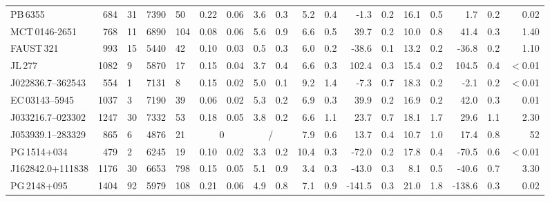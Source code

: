 \begin{table}
\begin{tabular}{lr@{ $\pm$ }lr@{ $\pm$ }lr@{ $\pm$ }lr@{ $\pm$ }lr@{ $\pm$ }lr@{ $\pm$ }lr@{ $\pm$ }lr@{ $\pm$ }lr}
    PB\,6355          &   684    &  31   &  7390   &  50   &  0.22   &  0.06   &  3.6   &  0.3             &  5.2    &  0.4   &  -1.3    &  0.2  &  16.1  &  0.5   &   1.7   &  0.2  &  0.02  \\
    MCT\,0146-2651    &   768    &  11   &  6890   &  104  &  0.08   &  0.06   &  5.6   &  0.9             &  6.6    &  0.5   &   39.7   &  0.2  &  10.0  &  0.8   &   41.4  &  0.3  &  1.40  \\
    FAUST\,321        &   993    &  15   &  5440   &  42   &  0.10   &  0.03   &  0.5   &  0.3             &  6.0    &  0.2   &  -38.6   &  0.1  &  13.2  &  0.2   &  -36.8  &  0.2  &  1.10  \\
    JL\,277           &   1082   &  9    &  5870   &  17   &  0.15   &  0.04   &  3.7   &  0.4             &  6.6    &  0.3   &  102.4   &  0.3  &  15.4  &  0.2   &  104.5  &  0.4  &  $<$0.01  \\
    J022836.7--362543 &   554    &  1    &  7131   &  8    &  0.15   &  0.02   &  5.0   &  0.1             &  9.2    &  1.4   &  -7.3    &  0.7  &  18.3  &  0.2   &   -2.1  &  0.2  &  $<$0.01  \\
    EC\,03143--5945   &   1037   &  3    &  7190   &  39   &  0.06   &  0.02   &  5.3   &  0.2             &  6.9    &  0.3   &  39.9    &  0.2  &  16.9  &  0.2   &   42.0  &  0.3  &  0.01  \\
    J033216.7--023302 &   1247   &  30   &  7332   &  53   &  0.18   &  0.05   &  3.8   &  0.2             &  6.6    &  1.1   &  23.7    &  0.7  &  18.1  &  1.7   &   29.6  &  1.1  &  2.30  \\
    J053939.1--283329 &   865    &  6    &  4876   &  21   &\multicolumn{2}{c}{0}& \multicolumn{2}{c}{/}   &  7.9    &  0.6   &  13.7    &  0.4  &  10.7  &  1.0   &   17.4  &  0.8  &  52  \\
    PG\,1514+034      &   479    &  2    &  6245   &  19   &  0.10   &  0.02   &  3.3   &  0.2             &  10.4   &  0.3   &  -72.0   &  0.2  &  17.8  &  0.4   &  -70.5  &  0.6  &  $<$0.01  \\
    J162842.0+111838  &   1176   &  30   &  6653   &  798  &  0.15   &  0.05   &  5.1   &  0.9             &  3.4    &  0.3   &  -43.0   &  0.3  &  8.1   &  0.5   &  -40.6  &  0.7  &  3.30  \\
    PG\,2148+095      &   1404   &  92   &  5979   &  108  &  0.21   &  0.06   &  4.9   &  0.8             &  7.1    &  0.9   &  -141.5  &  0.3  &  21.0  &  1.8   &  -138.6 &  0.3  &  0.02  \\\hline
    
   \end{tabular}
\end{table}
